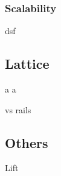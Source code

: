 \subsubsection*{Scalability}
dsf

\subsection{Lattice} \newpage a \newpage a

vs rails

\subsection{Others}
Lift











































